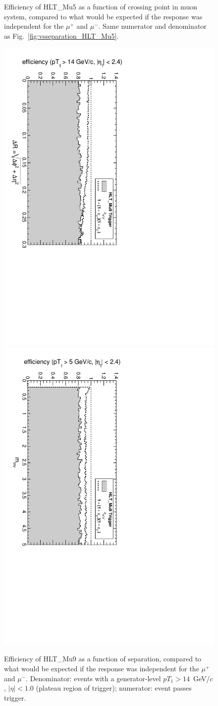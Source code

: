 \documentclass[12pt]{article}
\begin{document}
\begin{figure}[p]
\caption{Efficiency of HLT\_Mu5 as a function of crossing point in
  muon system, compared to what would be expected if the response was
  independent for the $\mu^+$ and $\mu^-$.  Same numerator and
  denominator as Fig.~\ref{fig:vsseparation_HLT_Mu5}. \label{fig:vsmuonpos_HLT_Mu5}}
\end{figure}

\begin{figure}[p]
\includegraphics[height=0.5\linewidth, angle=90]{fig/acceptance6_plot/vsdR_HLT_Mu9.pdf}
\includegraphics[height=0.5\linewidth, angle=90]{fig/acceptance6_plot/vsmass_HLT_Mu9.pdf}

\caption{Efficiency of HLT\_Mu9 as a function of separation, compared to what would be expected if the response was independent for the $\mu^+$ and $\mu^-$.  Denominator: events with a
  generator-level $pT_1 > 14$~GeV/$c$, $|\eta| < 1.0$ (plateau region
  of trigger); numerator: event passes trigger. \label{fig:vsseparation_HLT_Mu9}}
\end{figure}
\end{document}
